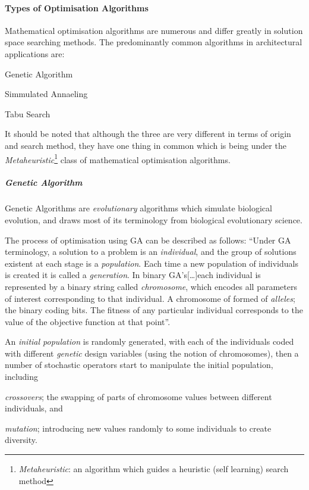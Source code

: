 \documentclass[11pt,a4paper,oneside]{article}
\begin{document}
\begin{multicols}{2}

	\paragraph{Types of Optimisation Algorithms}
	Mathematical optimisation algorithms are numerous and differ greatly in solution space searching methods. The predominantly common algorithms in architectural applications are:
	\begin{compactenum}
	\item Genetic Algorithm
	\item Simmulated Annaeling
	\item Tabu Search
	\end{compactenum}
	It should be noted that although the three are very different in terms of origin and search method, they have one thing in common which is being under the \emph{Metaheuristic}\footnote{\emph{Metaheuristic}: an algorithm which guides a heuristic (self learning) search method} class of mathematical optimisation algorithms.
	
	\subparagraph{Genetic Algorithm}

	Genetic Algorithms are \emph{evolutionary} algorithms which simulate biological evolution, and draws most of its terminology from biological evolutionary science.

	The process of optimisation using GA can be described as follows: ``Under GA terminology, a solution to a problem is an \emph{individual}, and the group of solutions existent at each stage is a \emph{population}. Each time a new population of individuals is created it is called a \emph{generation}. In binary GA's[\dots]each individual is represented by a binary string called \emph{chromosome}, which encodes all parameters of interest corresponding to that individual. A chromosome of formed of \emph{alleles}; the binary coding bits. The fitness of any particular individual corresponds to the value of the objective function at that point''. \cite{caldas01}

	An \emph{initial population} is randomly generated, with each of the individuals coded with different \emph{genetic} design variables (using the notion of chromosomes), then a number of stochastic operators start to manipulate the initial population, including \begin{inparaenum} \item \emph{crossovers}; the swapping of parts of chromosome values between different individuals, and \item \emph{mutation}; introducing new values randomly to some individuals to create diversity.\end{inparaenum}


\end{multicols}
\end{document}
